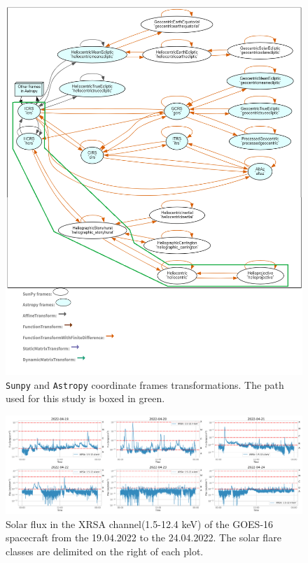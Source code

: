     \begin{figure}[H]
        \centering
        \includegraphics[width = 12cm]{report/Figures/methods/coordinates.png}
        \caption{\texttt{Sunpy} and \texttt{Astropy} coordinate frames transformations. The path used for this study is boxed in green.}
        \label{coordinates}
    \end{figure}

    \begin{figure}[H]
        \centering
        \includegraphics[width = \textwidth]{report/Figures/methods/GOES_total.png}
        \caption{Solar flux in the XRSA channel(1.5-12.4 keV) of the GOES-16 spacecraft from the 19.04.2022 to the 24.04.2022. The solar flare classes are delimited on the right of each plot.}
        \label{goes_tot}
    \end{figure}